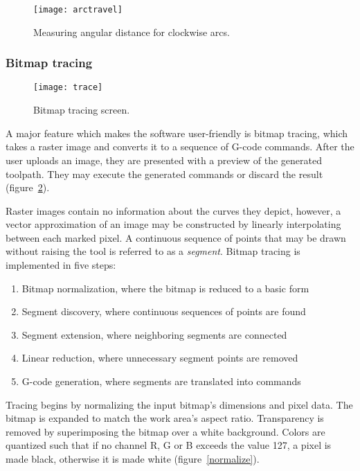 \begin{figure}[ht]
    \begin{center}
        \texttt{[image: arctravel]}
        \caption{Measuring angular distance for clockwise arcs.}
        \label{arctravel}
    \end{center}
\end{figure}

\clearpage
\subsubsection{Bitmap tracing}

\begin{figure}[ht]
    \begin{center}
        \texttt{[image: trace]}
        \caption{Bitmap tracing screen.}
        \label{trace}
    \end{center}
\end{figure}

A major feature which makes the software user-friendly is bitmap tracing,
which takes a raster image and converts it to a sequence of G-code commands.
After the user uploads an image, they are presented with a preview of the
generated toolpath. They may execute the generated commands or discard the
result (figure~\ref{trace}).

Raster images contain no information about the curves they depict, however, a
vector approximation of an image may be constructed by linearly interpolating
between each marked pixel. A continuous sequence of points that may be drawn
without raising the tool is referred to as a \textit{segment}. Bitmap tracing
is implemented in five steps:
\begin{enumerate}
    \item Bitmap normalization, where the bitmap is reduced to a basic form
    \item Segment discovery, where continuous sequences of points are found
    \item Segment extension, where neighboring segments are connected
    \item Linear reduction, where unnecessary segment points are removed
    \item G-code generation, where segments are translated into commands
\end{enumerate}

Tracing begins by normalizing the input bitmap's dimensions and pixel data. The
bitmap is expanded to match the work area's aspect ratio. Transparency is
removed by superimposing the bitmap over a white background. Colors are
quantized such that if no channel R, G or B exceeds the value 127, a pixel
is made black, otherwise it is made white (figure~\ref{normalize}).

